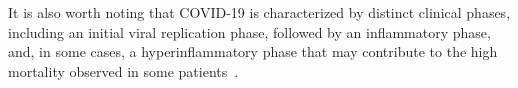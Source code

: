 \documentclass[Minh_PhD_thesis.tex]{subfiles}
\begin{document}




It is also worth noting that COVID-19 is characterized by distinct clinical phases, including an initial viral replication phase, followed by an inflammatory phase, and, in some cases, a hyperinflammatory phase  that may contribute to the high mortality observed in some patients~\cite{mehta2020covid}.
\end{document}
